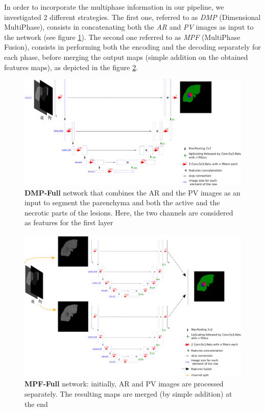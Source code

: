 \documentclass[]{article}
\newcommand{\pplfont}[1]{{\textbf{\fontfamily{ppl}\selectfont #1}}}
\begin{document}
In order to incorporate the multiphase information in our pipeline, we
investigated 2 different strategies. The first one, referred to as
\emph{DMP} (Dimensional MultiPhase), consists in concatenating both the
\emph{AR} and \emph{PV} images as input to the network (see figure \ref{CARS_DMP_Full_Fig}).
The second one referred to as \emph{MPF} (MultiPhase Fusion), consists
in performing both the encoding and the decoding separately for each
phase, before merging the output maps (simple addition on the obtained
features maps), as depicted in the figure \ref{CARS_MPF_Full_Fig}.

\begin{figure}[th!]
	\centering
	\includegraphics[width=0.7\linewidth]{images/image28}
	\caption{\pplfont{DMP-Full} network that combines the AR and the PV images as an input to segment the parenchyma and both the active and the necrotic parts of the lesions. Here, the two channels are considered as features for the first layer}
	\label{CARS_DMP_Full_Fig}
\end{figure}


\begin{figure}[th!]
	\centering
	\includegraphics[width=0.7\linewidth]{images/image36}
	\caption{\pplfont{MPF-Full} network: initially, AR and PV images are processed separately. The resulting maps are merged (by simple addition) at the end}
	\label{CARS_MPF_Full_Fig}
\end{figure}
\end{document}
